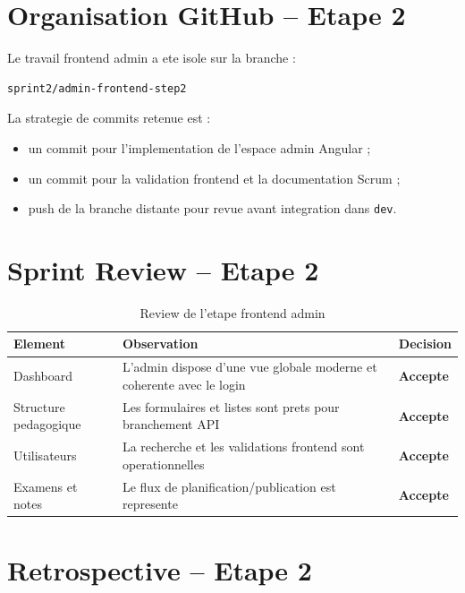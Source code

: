 \documentclass[12pt,a4paper]{report}
\begin{document}
\section{Organisation GitHub -- Etape 2}

Le travail frontend admin a ete isole sur la branche :

\begin{verbatim}
sprint2/admin-frontend-step2
\end{verbatim}

La strategie de commits retenue est :

\begin{itemize}[itemsep=0.3em]
    \item un commit pour l'implementation de l'espace admin Angular ;
    \item un commit pour la validation frontend et la documentation Scrum ;
    \item push de la branche distante pour revue avant integration dans \texttt{dev}.
\end{itemize}

\section{Sprint Review -- Etape 2}

\begin{table}[H]
\centering
\caption{Review de l'etape frontend admin}
\begin{tabular}{|p{5cm}|p{5cm}|p{3cm}|}
\hline
\textbf{Element} & \textbf{Observation} & \textbf{Decision} \\
\hline
Dashboard & L'admin dispose d'une vue globale moderne et coherente avec le login & \textbf{Accepte} \\
\hline
Structure pedagogique & Les formulaires et listes sont prets pour branchement API & \textbf{Accepte} \\
\hline
Utilisateurs & La recherche et les validations frontend sont operationnelles & \textbf{Accepte} \\
\hline
Examens et notes & Le flux de planification/publication est represente & \textbf{Accepte} \\
\hline
\end{tabular}
\end{table}

\section{Retrospective -- Etape 2}
\end{document}
